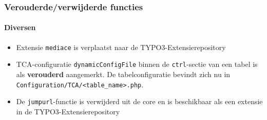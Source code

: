 
\begin{frame}[fragile]
	\frametitle{Verouderde/verwijderde functies}
	\framesubtitle{Diversen}

	\begin{itemize}

		\item Extensie \texttt{mediace} is verplaatst naar de TYPO3-Extensierepository

		\item TCA-configuratie \texttt{dynamicConfigFile} binnen de \texttt{ctrl}-sectie van een
			tabel is als \textbf{verouderd} aangemerkt.
			De tabelconfiguratie bevindt zich nu in \texttt{Configuration/TCA/<table\_name>.php}.

		\item De \texttt{jumpurl}-functie is verwijderd uit de core en is beschikbaar als een
			extensie in de TYPO3-Extensierepository

	\end{itemize}

\end{frame}

